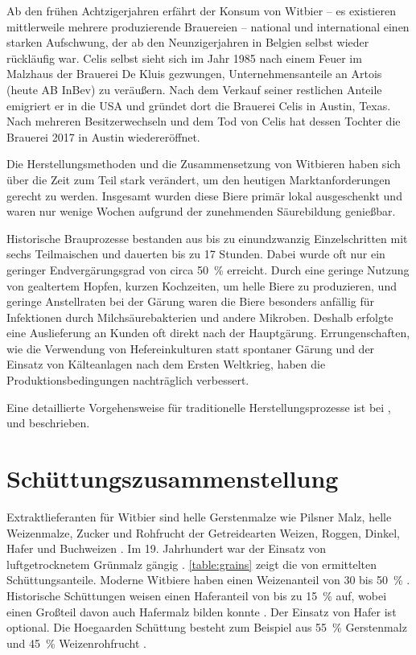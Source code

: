 \documentclass[a4paper,parskip=half]{scrartcl}
\begin{document}
Ab den frühen Achtzigerjahren erfährt der Konsum von Witbier – es
existieren mittlerweile mehrere produzierende Brauereien – national und
international einen starken Aufschwung, der
ab den Neunzigerjahren in Belgien selbst wieder rückläufig war.
Celis selbst sieht sich im Jahr 1985 nach einem Feuer im Malzhaus der Brauerei
De Kluis gezwungen, Unternehmensanteile an Artois (heute
AB InBev) zu veräußern. Nach dem Verkauf seiner restlichen Anteile
emigriert er in die USA und gründet dort die Brauerei Celis in Austin,
Texas. Nach mehreren Besitzerwechseln und dem Tod von Celis
hat dessen Tochter die Brauerei 2017 in Austin wiedereröffnet.
\parencites[1]{Strottner1999}[37,49]{Hieronymus2010}{Meewes2017}

Die Herstellungsmethoden und die Zusammensetzung von Witbieren haben
sich über die Zeit zum Teil stark verändert, um den heutigen
Marktanforderungen gerecht zu werden. Insgesamt wurden diese
Biere primär lokal ausgeschenkt und waren nur wenige
Wochen aufgrund der zunehmenden Säurebildung genießbar.
\parencite[118]{Strottner1999}

Historische Brauprozesse bestanden aus bis zu einundzwanzig
Einzelschritten mit sechs Teilmaischen und dauerten bis zu
17 Stunden. Dabei wurde oft nur ein geringer Endvergärungsgrad
von circa 50~\% erreicht. Durch eine geringe Nutzung von gealtertem
Hopfen, kurzen Kochzeiten, um helle Biere zu produzieren, 
und geringe Anstellraten bei der Gärung waren die Biere besonders
anfällig für Infektionen durch Milchsäurebakterien und andere Mikroben.
Deshalb erfolgte eine Auslieferung an Kunden oft direkt nach
der Hauptgärung. Errungenschaften, wie die Verwendung von
Hefereinkulturen statt spontaner Gärung und der Einsatz von
Kälteanlagen nach dem Ersten Weltkrieg, haben die Produktionsbedingungen
nachträglich verbessert. \parencite[38-41]{Hieronymus2010}

Eine detaillierte Vorgehensweise für traditionelle Herstellungsprozesse
ist bei \citeauthor{Hieronymus2010}, \citeauthor{Mulder2020} und
\citeauthor{Strottner1999} beschrieben.

\section*{Schüttungszusammenstellung}

Extraktlieferanten für Witbier sind helle Gerstenmalze wie Pilsner Malz,
helle Weizenmalze, Zucker und Rohfrucht der Getreidearten Weizen, Roggen,
Dinkel, Hafer und Buchweizen \parencite[14]{Strottner1999}. Im 19.
Jahrhundert war der Einsatz von luftgetrocknetem Grünmalz gängig
\parencite[38]{Hieronymus2010}. \autoref{table:grains} zeigt die von \citeauthor{Strottner1999}
ermittelten Schüttungsanteile. Moderne Witbiere haben einen Weizenanteil
von 30 bis 50~\% \parencite[45]{Mulder2020}. Historische
Schüttungen weisen einen Haferanteil von bis zu 15~\% auf, wobei
einen Großteil davon auch Hafermalz bilden konnte \parencite[45]{Hieronymus2010}.
Der Einsatz von Hafer ist optional. Die Hoegaarden Schüttung
besteht zum Beispiel aus 55~\% Gerstenmalz und 45~\% Weizenrohfrucht \parencite[43]{Strottner1999}.
\end{document}
